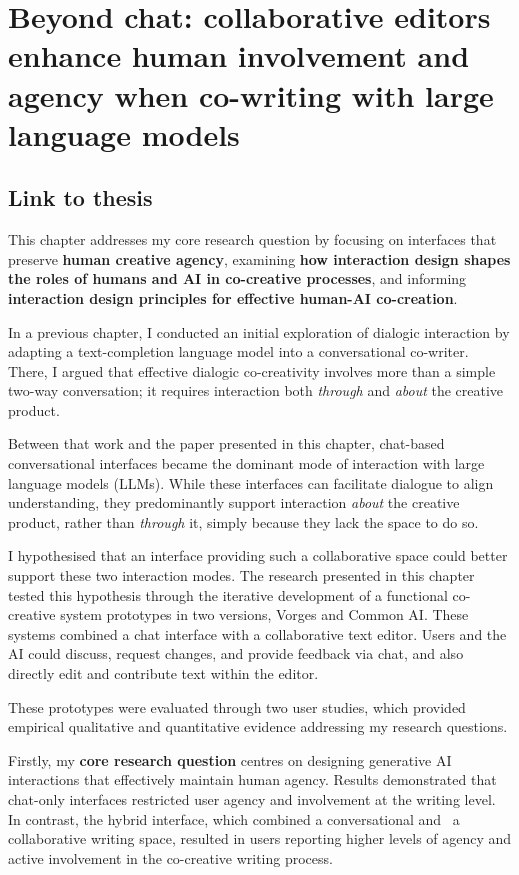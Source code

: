 \chapter[Human-AI Co-Creativity in Writing]{Beyond chat: collaborative editors enhance human involvement and agency when co-writing with large language models 
} \label{c:tc5} 

\section{Link to thesis}

This chapter addresses my core research question by focusing on interfaces that preserve \textbf{human creative agency}, examining \textbf{how interaction design shapes the roles of humans and AI in co-creative processes}, and informing \textbf{interaction design principles for effective human-AI co-creation}.

In a previous chapter, I conducted an initial exploration of dialogic interaction by adapting a text-completion language model into a conversational co-writer. There, I argued that effective dialogic co-creativity involves more than a simple two-way conversation; it requires interaction both \textit{through} and \textit{about} the creative product.

Between that work and the paper presented in this chapter, chat-based conversational interfaces became the dominant mode of interaction with large language models (LLMs). While these interfaces can facilitate dialogue to align understanding, they predominantly support interaction \textit{about} the creative product, rather than \textit{through} it, simply because they lack the space to do so.

I hypothesised that an interface providing such a collaborative space could better support these two interaction modes. The research presented in this chapter tested this hypothesis through the iterative development of a functional co-creative system prototypes in two versions, Vorges and Common AI. These systems combined a chat interface with a collaborative text editor. Users and the AI could discuss, request changes, and provide feedback via chat, and also directly edit and contribute text within the editor.

These prototypes were evaluated through two user studies, which provided empirical qualitative and quantitative evidence addressing my research questions.

Firstly, my \textbf{core research question} centres on designing generative AI interactions that effectively maintain human agency. Results demonstrated that chat-only interfaces restricted user agency and involvement at the writing level. In contrast, the hybrid interface, which combined a conversational and  a collaborative writing space, resulted in users reporting higher levels of agency and active involvement in the co-creative writing process.

